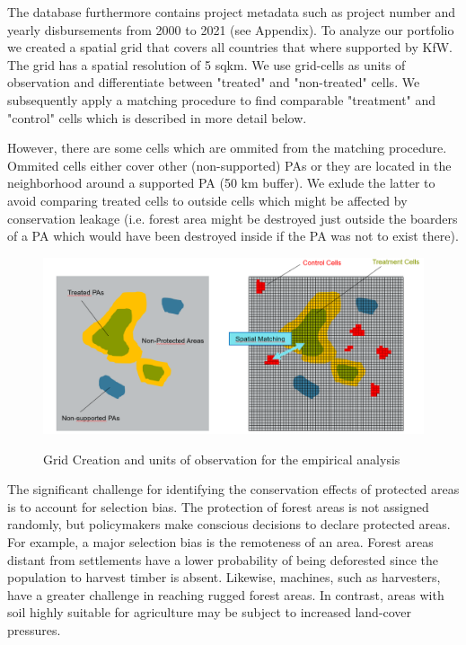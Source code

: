 \documentclass{article}
\begin{document}
The database furthermore contains project metadata such as project number and yearly disbursements from 2000 to 2021 (see Appendix). To analyze our portfolio we created a spatial grid that covers all countries that where supported by KfW. The grid has a spatial resolution of 5 sqkm. We use grid-cells as units of observation and differentiate between "treated" and "non-treated" cells. We subsequently apply a matching procedure to find comparable "treatment" and "control" cells which is described in more detail below. 

However, there are some cells which are ommited from the matching procedure. Ommited cells either cover other (non-supported) PAs or they are located in the neighborhood around a supported PA (50 km buffer). We exlude the latter to avoid comparing treated cells to outside cells which might be affected by conservation leakage  (i.e. forest area might be destroyed just outside the boarders of a PA which would have been destroyed inside if the PA was not to exist there). 

\begin{figure}[H]
\centering
\caption{Grid Creation and units of observation for the empirical analysis}
\includegraphics[width=0.8\linewidth]{"figures/landscape-segmentation"}
\label{fig:PAs}
\end{figure}







The significant challenge for identifying the conservation effects of protected areas is to account for selection bias. The protection of forest areas is not assigned randomly, but policymakers make conscious decisions to declare protected areas. For example, a major selection bias is the remoteness of an area. Forest areas distant from settlements have a lower probability of being deforested since the population to harvest timber is absent. Likewise, machines, such as harvesters, have a greater challenge in reaching rugged forest areas. In contrast, areas with soil highly suitable for agriculture may be subject to increased land-cover pressures.
\end{document}
